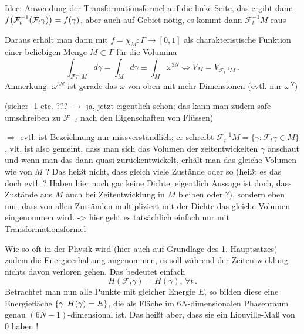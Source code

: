 \documentclass[../KlassMech_main.tex]{subfiles}
\begin{document}
Idee: Anwendung der Transformationsformel auf die linke Seite, das ergibt dann $f\qty(\mathcal{F}_t^{-1}(\mathcal{F}_t \gamma)) = f(\gamma)$, aber auch auf Gebiet nötig, es kommt dann $\mathcal{F}_t^{-1}M$ raus


Daraus erhält man dann mit $f = \chi_M: \Gamma \rightarrow [0,1]$ als charakteristische Funktion einer beliebigen Menge $M \subset \Gamma$ für die Volumina
\begin{equation}
\int_{\mathcal{F}_t^{-1} M} d\gamma = \int_M d\gamma  \equiv \int_M \omega^{3N} \Leftrightarrow V_M = V_{\mathcal{F}_t^{-1}M} \, .
\end{equation}
Anmerkung: $\omega^{3N}$ ist gerade das $\omega$ von oben mit mehr Dimensionen (evtl. nur $\omega^N$)

(sicher -1 etc. ??? $\rightarrow$ ja, jetzt eigentlich schon; das kann man zudem safe umschreiben zu $\mathcal{F}_{-t}$ nach den Eigenschaften von Flüssen)

$\Rightarrow$ evtl. ist Bezeichnung nur missverständlich; er schreibt $\mathcal{F}_t^{-1}M = \{\gamma: \mathcal{F}_t \gamma \in M\}$, vlt. ist also gemeint, dass man sich das Volumen der zeitentwickelten $\gamma$ anschaut und wenn man das dann quasi zurückentwickelt, erhält man das gleiche Volumen wie von $M$ ? Das heißt nicht, dass gleich viele Zustände oder so (heißt es das doch evtl. ? Haben hier noch gar keine Dichte; eigentlich Aussage ist doch, dass Zustände aus $M$ auch bei Zeitentwicklung in $M$ bleiben oder ?), sondern eben nur, dass von allen Zuständen multipliziert mit der Dichte das gleiche Volumen eingenommen wird.
-> hier geht es tatsächlich einfach nur mit Transformationsformel

Wie so oft in der Physik wird (hier auch auf Grundlage des 1. Hauptsatzes) zudem die Energieerhaltung angenommen, es soll während der Zeitentwicklung nichts davon verloren gehen. Das bedeutet einfach
\begin{equation}
H(\mathcal{F}_t \gamma) = H(\gamma), \, \forall t \, .
\end{equation}
Betrachtet man nun alle Punkte mit gleicher Energie $E$, so bilden diese eine Energiefläche $\qty{\gamma | \, H(\gamma) = E}$, die als Fläche im $6N$-dimensionalen Phasenraum genau $(6N-1)$-dimensional ist. Das heißt aber, dass sie ein Liouville-Maß von 0 haben !
\end{document}
